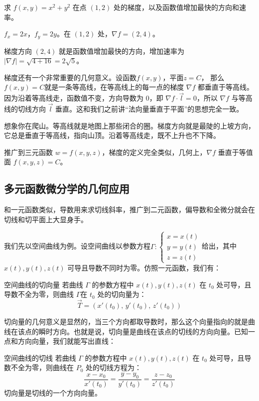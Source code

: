 \begin{myexample}
  求 $f(x, y) = x^2 + y^2$ 在点 $(1, 2)$ 处的梯度，以及函数值增加最快的方向和速率。

  $f_x = 2x$，$f_y = 2y$。在 $(1, 2)$ 处，$\nabla f = (2, 4)$。

  梯度方向 $(2, 4)$ 就是函数值增加最快的方向，增加速率为 $|\nabla f| = \sqrt{4 + 16} = 2\sqrt{5}$。
\end{myexample}

梯度还有一个非常重要的几何意义。设函数$f(x, y)$，平面$z = C$， 那么$f(x, y) = C$就是一条等高线，在等高线上的每一点的梯度 $\nabla f$ 都垂直于等高线。因为沿着等高线走，函数值不变，方向导数为 $0$，即 $\nabla f \cdot \vec{l} = 0$，所以 $\nabla f$ 与等高线的切线方向 $\vec{l}$ 垂直。这和我们之前讲“法向量垂直于平面”的思想完全一致。

想象你在爬山。等高线就是地图上那些闭合的圈。梯度方向就是最陡的上坡方向，它总是垂直于等高线，指向山顶。沿着等高线走，既不上升也不下降。

推广到三元函数 $w = f(x, y, z)$，梯度的定义完全类似，几何上，$\nabla f$ 垂直于等值面 $f(x, y, z) = C$。

\subsection{多元函数微分学的几何应用}

和一元函数类似，导数用来求切线斜率，推广到二元函数，偏导数和全微分就会在切线和切平面上大显身手。

我们先以空间曲线为例。设空间曲线以参数方程$\Gamma: 
\begin{cases}
x = x(t)\\
y = y(t)\\
z = z(t)
\end{cases}$给出，其中 $x(t), y(t), z(t)$ 可导且导数不同时为零。仿照一元函数，我们有：

\begin{theorem}{空间曲线的切向量}{}
若曲线 $\Gamma$ 的参数方程中 $x(t), y(t), z(t)$ 在 $t_0$ 处可导，且导数不全为零，则曲线 $\Gamma$在 $t_0$ 处的切向量为：
\[
\vec{T} = ( x'(t_0),\, y'(t_0),\, z'(t_0) )
\]
\end{theorem}

切向量的几何意义是显然的，当三个方向都取导数时，那么这个向量指向的就是曲线在该点的瞬时方向。也就是说，切向量是曲线在该点的切线的方向向量。已知一点和方向向量，我们就能写出直线：

\begin{theorem}{空间曲线的切线}{}
  若曲线 $\Gamma$ 的参数方程中 $x(t), y(t), z(t)$ 在 $t_0$ 处可导，且导数不全为零，则曲线在 $P_0$ 处的切线方程为：
\[
\frac{x-x_0}{x'(t_0)} = \frac{y-y_0}{y'(t_0)} = \frac{z-z_0}{z'(t_0)}
\]
切向量是切线的一个方向向量。
\end{theorem}

